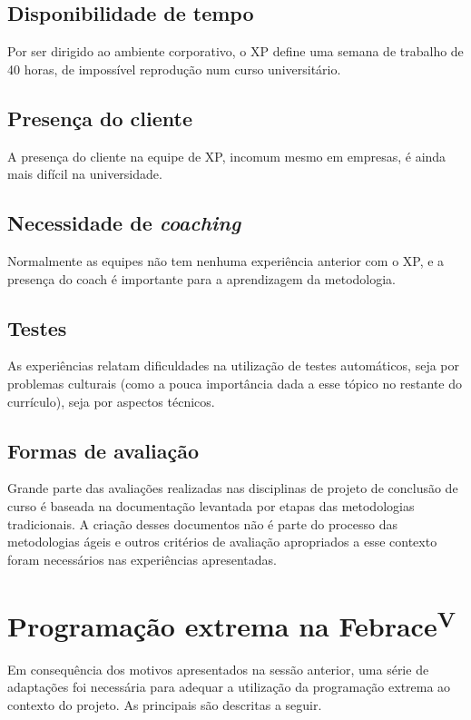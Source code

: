 \documentclass[a4paper,12pt,font=plain,header=plain]{abnt}
\begin{document}
	\subsection{Disponibilidade de tempo}
		Por ser dirigido ao ambiente corporativo, o XP define uma semana de trabalho de 40 horas, de impossível reprodução num curso universitário.
	
	\subsection{Presença do cliente}
		A presença do cliente na equipe de XP, incomum mesmo em empresas, é ainda mais difícil na universidade.
	
	\subsection{Necessidade de \textit{coaching}}
		Normalmente as equipes não tem nenhuma experiência anterior com o XP, e a presença do coach é importante para a aprendizagem da metodologia.
	
	\subsection{Testes}
		As experiências relatam dificuldades na utilização de testes automáticos, seja por problemas culturais (como a pouca importância dada a esse tópico no restante do currículo), seja por aspectos técnicos.
	
	\subsection{Formas de avaliação}
		Grande parte das avaliações realizadas nas disciplinas de projeto de conclusão de curso é baseada na documentação levantada por etapas das metodologias tradicionais. A criação desses documentos não é parte do processo das metodologias ágeis e outros critérios de avaliação apropriados a esse contexto foram necessários nas experiências apresentadas.
	
	\section{Programação extrema na Febrace\textsuperscript{V}}
	Em consequência dos motivos apresentados na sessão anterior, uma série de adaptações foi necessária para adequar a utilização da programação extrema ao contexto do projeto. As principais são descritas a seguir.
	
\end{document}
